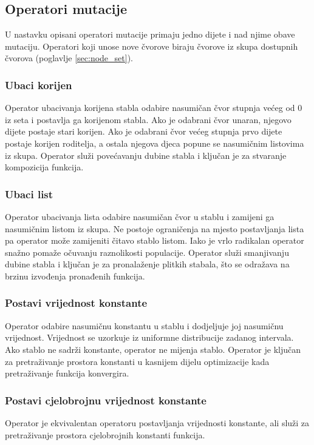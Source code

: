 \documentclass[times, utf8, numeric, diplomski]{fer}
\def\secref#1{(poglavlje \ref{#1})}
\begin{document}
\subsection{Operatori mutacije}
U nastavku opisani operatori mutacije primaju jedno dijete i nad njime obave mutaciju. Operatori koji unose nove čvorove biraju čvorove iz skupa dostupnih čvorova \secref{sec:node_set}.

\subsubsection{Ubaci korijen}
Operator ubacivanja korijena stabla odabire nasumičan čvor stupnja većeg od 0 iz seta i postavlja ga korijenom stabla. Ako je odabrani čvor unaran, njegovo dijete postaje stari korijen. Ako je odabrani čvor većeg stupnja prvo dijete postaje korijen roditelja, a ostala njegova djeca popune se nasumičnim listovima iz skupa. Operator služi povećavanju dubine stabla i ključan je za stvaranje kompozicija funkcija.

\subsubsection{Ubaci list}
Operator ubacivanja lista odabire nasumičan čvor u stablu i zamijeni ga nasumičnim listom iz skupa. Ne postoje ograničenja na mjesto postavljanja lista pa operator može zamijeniti čitavo stablo listom. Iako je vrlo radikalan operator snažno pomaže očuvanju raznolikosti populacije. Operator služi smanjivanju dubine stabla i ključan je za pronalaženje plitkih stabala, što se odražava na brzinu izvođenja pronađenih funkcija.

\subsubsection{Postavi vrijednost konstante}
Operator odabire nasumičnu konstantu u stablu i dodjeljuje joj nasumičnu vrijednost. Vrijednost se uzorkuje iz uniformne distribucije zadanog intervala. Ako stablo ne sadrži konstante, operator ne mijenja stablo. Operator je ključan za pretraživanje prostora konstanti u kasnijem dijelu optimizacije kada pretraživanje funkcija konvergira.

\subsubsection{Postavi cjelobrojnu vrijednost konstante}
Operator je ekvivalentan operatoru postavljanja vrijednosti konstante, ali služi za pretraživanje prostora cjelobrojnih konstanti funkcija.
\end{document}
